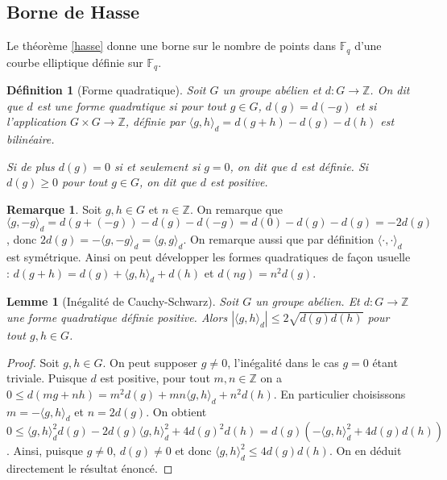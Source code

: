 \documentclass{article}
\theoremstyle{plain}%
\newtheorem{deff}[thm]{Définition}
\newtheorem{lem}[thm]{Lemme}
\theoremstyle{definition}%
\newtheorem{rem}[thm]{Remarque}
\newcommand{\F}{\mathbb{F}}
\newcommand{\Z}{\mathbb{Z}}
\begin{document}
\subsection{Borne de Hasse}

Le théorème \ref{hasse} donne une borne sur le nombre de points dans $\F_q$ d'une courbe elliptique définie sur $\F_q$.

\begin{deff}[Forme quadratique]
  Soit $G$ un groupe abélien et $d:G\to \Z$. On dit que $d$ est une forme quadratique si pour tout $g \in G$, $d(g) = d(-g)$ et si l'application $G\times G \to \mathbb Z$, définie par  $\langle g, h\rangle_d = d(g+h) - d(g) -d(h)$ est bilinéaire.

  Si de plus $d(g) = 0$ si et seulement si $g=0$, on dit que $d$ est définie. Si $d(g) \ge 0$ pour tout $g\in G$, on dit que $d$ est positive.
\end{deff}

\begin{rem}
  Soit $g, h\in G$ et $n\in \Z$. On remarque que $\langle g, -g\rangle_d =d(g + (-g)) - d(g) -d(-g) = d(0) - d(g) -d(g) = -2d(g)$, donc $2d(g) = -\langle g, -g\rangle_d = \langle g, g\rangle_d$. On remarque aussi que par définition $\langle\cdot,\cdot\rangle_d$ est symétrique. Ainsi on peut développer les formes quadratiques de façon usuelle : $d(g+h) =  d(g) + \langle g, h\rangle_d + d(h)$ et $d(ng) = n^2d(g)$.
\end{rem}

\begin{lem}[Inégalité de Cauchy-Schwarz]
  \label{Cauchy-Schwarz}
  Soit $G$ un groupe abélien. Et $d:G\to \mathbb Z$ une forme quadratique définie positive. Alors $|\langle g, h\rangle_d|\le 2\sqrt{d(g)d(h)}$ pour tout $g, h\in G$.  
\end{lem}

\begin{proof}
  Soit $g, h\in G$. On peut supposer $g\neq 0$, l'inégalité dans le cas $g=0$ étant triviale. Puisque $d$ est positive, pour tout $m, n\in \Z$ on a $0 \le d(mg + nh) = m^2d(g) + mn\langle g, h\rangle_d + n^2d(h)$. En particulier choisissons $m = -\langle g, h\rangle_d$ et $n=2d(g)$. On obtient $0 \le \langle g, h\rangle_d^2d(g) -2d(g)\langle g, h\rangle_d^2 + 4d(g)^2d(h) = d(g)(-\langle g, h\rangle_d^2 + 4d(g)d(h))$. Ainsi, puisque $g\neq 0$, $d(g)\neq 0$ et donc $\langle g, h\rangle_d^2 \le 4d(g)d(h)$. On en déduit directement le résultat énoncé.
  \end{proof}
\end{document}
